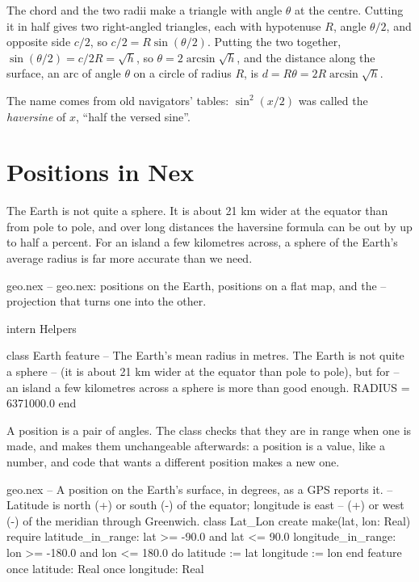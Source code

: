 The chord and the two radii make a triangle with angle $\theta$ at the
centre. Cutting it in half gives two right-angled triangles, each with
hypotenuse $R$, angle $\theta/2$, and opposite side $c/2$, so
$c/2 = R\sin(\theta/2)$. Putting the two together,
$\sin(\theta/2) = c / 2R = \sqrt{h}$, so $\theta = 2\arcsin\sqrt{h}$, and
the distance along the surface, an arc of angle $\theta$ on a circle of
radius $R$, is $d = R\theta = 2R\arcsin\sqrt{h}$.

The name comes from old navigators' tables: $\sin^2(x/2)$ was called the
\emph{haversine} of $x$, ``half the versed sine''.

\section{Positions in Nex}

The Earth is not quite a sphere. It is about 21 km wider at the equator
than from pole to pole, and over long distances the haversine formula can
be out by up to half a percent. For an island a few kilometres across, a
sphere of the Earth's average radius is far more accurate than we need.

\begin{newfile}{geo.nex}
-- geo.nex: positions on the Earth, positions on a flat map, and the
-- projection that turns one into the other.

intern Helpers

class Earth
feature
  -- The Earth's mean radius in metres. The Earth is not quite a sphere
  -- (it is about 21 km wider at the equator than pole to pole), but for
  -- an island a few kilometres across a sphere is more than good enough.
  RADIUS = 6371000.0
end
\end{newfile}

A position is a pair of angles. The class checks that they are in range
when one is made, and  makes them unchangeable afterwards: a
position is a value, like a number, and code that wants a different
position makes a new one.

\begin{append}{geo.nex}
-- A position on the Earth's surface, in degrees, as a GPS reports it.
-- Latitude is north (+) or south (-) of the equator; longitude is east
-- (+) or west (-) of the meridian through Greenwich.
class Lat_Lon
create
  make(lat, lon: Real)
  require
    latitude_in_range: lat >= -90.0 and lat <= 90.0
    longitude_in_range: lon >= -180.0 and lon <= 180.0
  do
    latitude := lat
    longitude := lon
  end
feature
  once latitude: Real
  once longitude: Real
\end{append}

